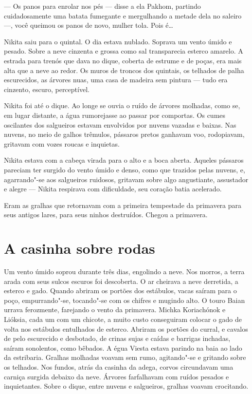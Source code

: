 --- Os panos para enrolar nos pés --- disse a ela Pakhom, partindo
cuidadosamente uma batata fumegante e mergulhando a metade dela no
saleiro ---, você queimou os panos de novo, mulher tola. Pois é\ldots{}

Nikita saiu para o quintal. O dia estava nublado. Soprava um vento úmido
e pesado. Sobre a neve cinzenta e grossa como sal transparecia esterco
amarelo. A estrada para trenós que dava no dique, coberta de estrume e de
poças, era mais alta que a neve ao redor. Os muros de troncos dos
quintais, os telhados de palha escurecidos, as árvores nuas, uma casa de
madeira sem pintura --- tudo era cinzento, escuro, perceptível.

Nikita foi até o dique. Ao longe se ouvia o ruído de árvores molhadas,
como se, em lugar distante, a água rumorejasse ao passar por comportas.
Os cumes oscilantes dos salgueiros estavam envolvidos por nuvens vazadas
e baixas. Nas nuvens, no meio de galhos trêmulos, pássaros pretos
ganhavam voo, rodopiavam, gritavam com vozes roucas e inquietas.

Nikita estava com a cabeça virada para o alto e a boca aberta. Aqueles
pássaros pareciam ter surgido do vento úmido e denso, como que trazidos
pelas nuvens, e, agarrando"-se aos salgueiros ruidosos, gritavam sobre
algo angustiante, assustador e alegre --- Nikita respirava com
dificuldade, seu coração batia acelerado.

Eram as gralhas que retornavam com a primeira tempestade da primavera
para seus antigos lares, para seus ninhos destruídos. Chegou a
primavera.

\chapter{A casinha sobre rodas}

Um vento úmido soprou durante três dias, engolindo a neve. Nos morros, a
terra arada com seus sulcos escuros foi descoberta. O ar cheirava a neve
derretida, a esterco e gado. Quando abriram os portões dos estábulos,
vacas saíram para o poço, empurrando"-se, tocando"-se com os chifres e
mugindo alto. O touro Baian urrava ferozmente, farejando o vento da
primavera. Michka Koriachónok e Lióksia, cada um com um chicote, a muito
custo conseguiram colocar o gado de volta nos estábulos entulhados de
esterco. Abriram os portões do curral, e cavalos de pelo escurecido e
desbotado, de crinas sujas e caídas e barrigas inchadas, saíram
sonolentos, como bêbados. A égua Viesta estava parindo na baia ao lado
da estribaria. Gralhas molhadas voavam sem rumo, agitando"-se e gritando
sobre os telhados. Nos fundos, atrás da casinha da adega, corvos
circundavam uma carniça surgida debaixo da neve. Árvores farfalhavam com
ruídos pesados e inquietantes. Sobre o dique, entre nuvens e salgueiros,
gralhas voavam crocitando.

